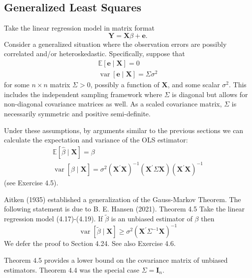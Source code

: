 \documentclass[10pt]{article}
\begin{document}
\subsection{Generalized Least Squares}
Take the linear regression model in matrix format
$$
\boldsymbol{Y}=\boldsymbol{X} \beta+\boldsymbol{e} .
$$
Consider a generalized situation where the observation errors are possibly correlated and/or heteroskedastic. Specifically, suppose that
$$
\begin{gathered}
\mathbb{E}[\boldsymbol{e} \mid \boldsymbol{X}]=0 \\
\operatorname{var}[\boldsymbol{e} \mid \boldsymbol{X}]=\Sigma \sigma^{2}
\end{gathered}
$$
for some $n \times n$ matrix $\Sigma>0$, possibly a function of $\boldsymbol{X}$, and some scalar $\sigma^{2}$. This includes the independent sampling framework where $\Sigma$ is diagonal but allows for non-diagonal covariance matrices as well. As a scaled covariance matrix, $\Sigma$ is necessarily symmetric and positive semi-definite.

Under these assumptions, by arguments similar to the previous sections we can calculate the expectation and variance of the OLS estimator:
$$
\begin{gathered}
\mathbb{E}[\widehat{\beta} \mid \boldsymbol{X}]=\beta \\
\operatorname{var}[\widehat{\beta} \mid \boldsymbol{X}]=\sigma^{2}\left(\boldsymbol{X}^{\prime} \boldsymbol{X}\right)^{-1}\left(\boldsymbol{X}^{\prime} \Sigma \boldsymbol{X}\right)\left(\boldsymbol{X}^{\prime} \boldsymbol{X}\right)^{-1}
\end{gathered}
$$
(see Exercise 4.5).

Aitken (1935) established a generalization of the Gauss-Markov Theorem. The following statement is due to B. E. Hansen (2021). Theorem 4.5 Take the linear regression model (4.17)-(4.19). If $\widetilde{\beta}$ is an unbiased estimator of $\beta$ then
$$
\operatorname{var}[\widetilde{\beta} \mid \boldsymbol{X}] \geq \sigma^{2}\left(\boldsymbol{X}^{\prime} \Sigma^{-1} \boldsymbol{X}\right)^{-1}
$$
We defer the proof to Section 4.24. See also Exercise 4.6.

Theorem $4.5$ provides a lower bound on the covariance matrix of unbiased estimators. Theorem $4.4$ was the special case $\Sigma=\boldsymbol{I}_{n}$.
\end{document}
